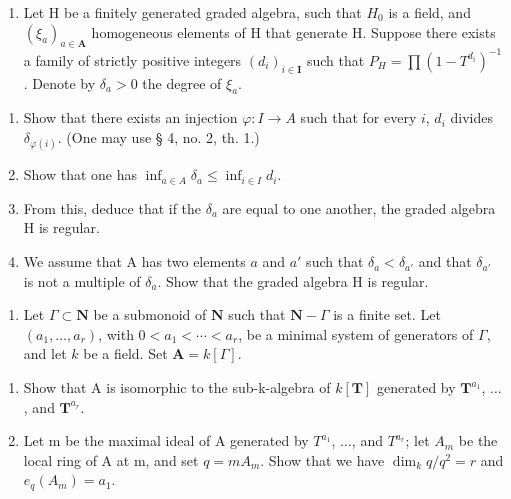 \begin{enumerate}
\def\labelenumi{\arabic{enumi})}
\setcounter{enumi}{11}
\tightlist
\item
  Let H be a finitely generated graded algebra, such that \(H_{0}\) is a field, and \((\xi_{a})_{a\in\mathbf{A}}\) homogeneous elements of H that generate H. Suppose there exists a family of strictly positive integers \((d_{i})_{i\in\mathbf{I}}\) such that \(P_{H}=\prod(1-T^{d_{i}})^{-1}\). Denote by \(\delta_{a}>0\) the degree of \(\xi_{a}\).
\end{enumerate}

\begin{enumerate}
\def\labelenumi{\alph{enumi})}
\item
  Show that there exists an injection \(\varphi: I \to A\) such that for every \(i\), \(d_i\) divides \(\delta_{\varphi(i)}\). (One may use § 4, no. 2, th. 1.)
\item
  Show that one has \(\inf_{a \in A} \delta_a \leqslant \inf_{i \in I} d_i\).
\item
  From this, deduce that if the \(\delta_{a}\) are equal to one another, the graded algebra H is regular.
\item
  We assume that A has two elements \(a\) and \(a'\) such that \(\delta_{a} < \delta_{a'}\) and that \(\delta_{a'}\) is not a multiple of \(\delta_{a}\). Show that the graded algebra H is regular.
\end{enumerate}


\begin{enumerate}
\def\labelenumi{\arabic{enumi})}
\tightlist
\item
  Let \(\Gamma \subset \mathbf{N}\) be a submonoid of \(\mathbf{N}\) such that \(\mathbf{N} - \Gamma\) is a finite set. Let \((a_1, \ldots, a_r)\), with \(0 < a_1 < \cdots < a_r\), be a minimal system of generators of \(\Gamma\), and let \(k\) be a field. Set \(\mathbf{A} = k[\Gamma]\).
\end{enumerate}

\begin{enumerate}
\def\labelenumi{\alph{enumi})}
\item
  Show that A is isomorphic to the sub-k-algebra of \(k[\mathbf{T}]\) generated by \(\mathbf{T}^{a_1}\), \(\ldots\), and \(\mathbf{T}^{a_r}\).
\item
  Let m be the maximal ideal of A generated by \(T^{a_{1}}\), \(\ldots\), and \(T^{a_{r}}\); let \(A_{m}\) be the local ring of A at m, and set \(q = mA_{m}\). Show that we have \(\dim_{k}q/q^{2} = r\) and \(e_{q}(A_{m}) = a_{1}\).
\end{enumerate}

